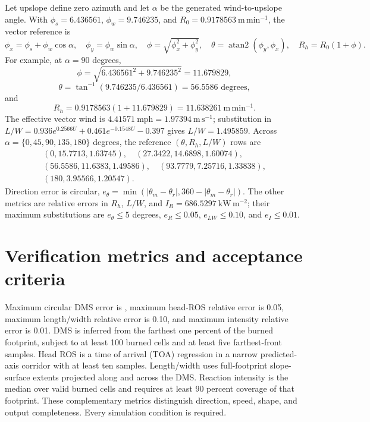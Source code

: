 Let upslope define zero azimuth and let \(\alpha\) be the generated
wind-to-upslope angle.  With \(\phi_s=6.436561\),
\(\phi_w=9.746235\), and \(R_0=0.9178563~\mathrm{m\,min^{-1}}\),
the vector reference is
\[
 \phi_x=\phi_s+\phi_w\cos\alpha,\quad
 \phi_y=\phi_w\sin\alpha,\quad
 \phi=\sqrt{\phi_x^2+\phi_y^2},\quad
 \theta=\operatorname{atan2}(\phi_y,\phi_x),\quad
 R_h=R_0(1+\phi).
\]
For example, at \(\alpha=90\) degrees,
\[\phi=\sqrt{6.436561^2+9.746235^2}=11.679829,\]
\[\theta=\tan^{-1}(9.746235/6.436561)=56.5586\text{ degrees},\]and
\[R_h=0.9178563(1+11.679829)=11.638261~\mathrm{m\,min^{-1}}.\]
The effective vector wind is \(4.41571~\mathrm{mph}=1.97394~\mathrm{m\,s^{-1}}\);
substitution in
\(L/W=0.936e^{0.2566U}+0.461e^{-0.1548U}-0.397\)
gives \(L/W=1.495859\).  Across
\(\alpha=\{0,45,90,135,180\}\) degrees, the reference
\((\theta,R_h,L/W)\) rows are
\[
\begin{gathered}
 (0,15.7713,1.63745),\quad (27.3422,14.6898,1.60074),\\
 (56.5586,11.6383,1.49586),\quad (93.7779,7.25716,1.33838),\\
 (180,3.95566,1.20547).
\end{gathered}
\]
Direction error is circular,
\(e_\theta=\min(|\theta_m-\theta_r|,360-|\theta_m-\theta_r|)\).
The other metrics are relative errors in \(R_h\), \(L/W\), and
\(I_R=686.5297~\mathrm{kW\,m^{-2}}\); their maximum substitutions are
\(e_\theta\leq5\) degrees, \(e_R\leq0.05\),
\(e_{LW}\leq0.10\), and \(e_I\leq0.01\).

\section{Verification metrics and acceptance criteria}
Maximum circular DMS error is \DirectionTolerance{}, maximum head-ROS relative error is 0.05, maximum length/width relative error is 0.10, and maximum intensity relative error is 0.01.  DMS is inferred from the farthest one percent of the burned footprint, subject to at least 100 burned cells and at least five farthest-front samples. Head ROS is a time of arrival (TOA) regression in a narrow predicted-axis corridor with at least ten samples. Length/width uses full-footprint slope-surface extents projected along and across the DMS. Reaction intensity is the median over valid burned cells and requires at least 90 percent coverage of that footprint. These complementary metrics distinguish direction, speed, shape, and output completeness.  Every simulation condition is required.

